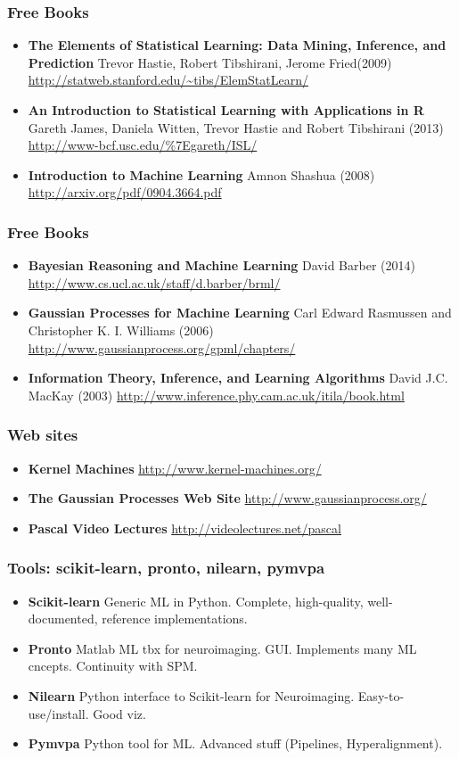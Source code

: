 \begin{frame}
\frametitle{Free Books}
\begin{itemize}
\item {\bf The Elements of Statistical Learning: Data Mining, Inference, and Prediction}
      Trevor Hastie, Robert Tibshirani, Jerome Fried(2009)
      \url{http://statweb.stanford.edu/~tibs/ElemStatLearn/}
\item {\bf An Introduction to Statistical Learning with Applications in R}
      Gareth James, Daniela Witten, Trevor Hastie and Robert Tibshirani (2013)
      \url{http://www-bcf.usc.edu/\%7Egareth/ISL/}
\item {\bf Introduction to Machine Learning}
      Amnon Shashua (2008)
      \url{http://arxiv.org/pdf/0904.3664.pdf}
\end{itemize}
\end{frame}

\begin{frame}
\frametitle{Free Books}
\begin{itemize}
\item {\bf Bayesian Reasoning and Machine Learning}
      David Barber (2014)
      \url{http://www.cs.ucl.ac.uk/staff/d.barber/brml/}
\item {\bf Gaussian Processes for Machine Learning}
      Carl Edward Rasmussen and Christopher K. I. Williams (2006)
      \url{http://www.gaussianprocess.org/gpml/chapters/}
\item {\bf Information Theory, Inference, and Learning Algorithms}
      David J.C. MacKay (2003)
      \url{http://www.inference.phy.cam.ac.uk/itila/book.html}
\end{itemize}
\end{frame}

\begin{frame}
\frametitle{Web sites}
\begin{itemize}
\item {\bf Kernel Machines} \url{http://www.kernel-machines.org/}
\item {\bf The Gaussian Processes Web Site} \url{http://www.gaussianprocess.org/}
\item {\bf Pascal Video Lectures}  \url{http://videolectures.net/pascal}
\end{itemize}
\end{frame}

\begin{frame}
\frametitle{Tools: scikit-learn, pronto, nilearn, pymvpa}

\begin{itemize}
\item \textbf{Scikit-learn} Generic ML in Python. Complete,
  high-quality, well-documented, reference implementations.
\item \textbf{Pronto} Matlab ML tbx for neuroimaging. GUI. Implements
  many ML cncepts. Continuity with SPM.
\item \textbf{Nilearn} Python interface to Scikit-learn for
  Neuroimaging. Easy-to-use/install. Good viz.
\item \textbf{Pymvpa} Python tool for ML. Advanced stuff
  (Pipelines, Hyperalignment).
\end{itemize}
\end{frame}

